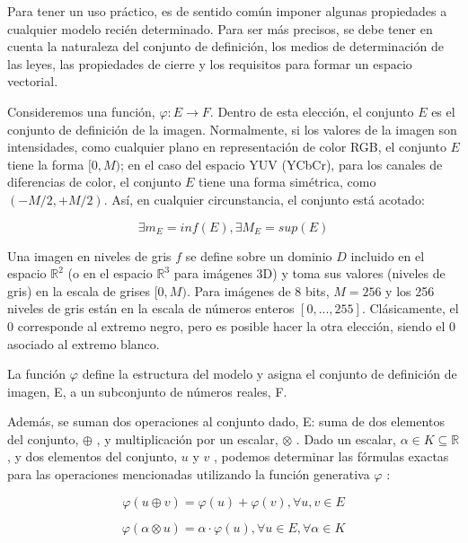 Para tener un uso práctico, es de sentido común imponer algunas propiedades a cualquier modelo recién determinado. Para ser más precisos, se debe tener en cuenta la naturaleza del conjunto de definición, los medios de determinación de las leyes, las propiedades de cierre y los requisitos para formar un espacio vectorial. 

Consideremos una función, $\varphi : E \rightarrow F$. Dentro de esta elección, el conjunto $E$ es el conjunto de definición de la imagen. Normalmente, si los valores de la imagen son intensidades, como cualquier plano en representación de color RGB, el conjunto $E$ tiene la forma $[0,M)$; en el caso del espacio YUV (YCbCr), para los canales de diferencias de color, el conjunto $E$ tiene una forma simétrica, como $( - M/2 , + M/2 )$. Así, en cualquier circunstancia, el conjunto está acotado:

\begin{equation}
	\exists m_E=inf(E),\exists M_E=sup(E)
\end{equation}

Una imagen en niveles de gris $f$ se define sobre un dominio $D$ incluido en el espacio $\mathbb{R}^2$ (o en el espacio $\mathbb{R}^3$  para imágenes 3D) y toma sus valores (niveles de gris) en la escala de grises $[0, M)$. Para imágenes de 8 bits, $ M = 256$ y los 256 niveles de gris están en la escala de números enteros $[0,..., 255]$. Clásicamente, el 0 corresponde al extremo negro, pero es posible hacer la otra elección, siendo el 0 asociado al extremo blanco.

La función $\varphi$ define la estructura del modelo y asigna el conjunto de definición de imagen, E, a un subconjunto de números reales, F.

Además, se suman dos operaciones al conjunto dado, E: suma de dos elementos del conjunto, $\oplus$ , y multiplicación por un escalar, $\otimes$ . Dado un escalar, $\alpha \in K \subseteq \mathbb{R}$ , y dos elementos del conjunto, $u$ y $v$ , podemos determinar las fórmulas exactas para las operaciones mencionadas utilizando la función generativa $\varphi$ :

\begin{equation}
	\varphi(u\oplus v) = \varphi(u)+\varphi(v), \forall u,v \in E
\end{equation}

\begin{equation}
	\varphi(\alpha \otimes u) = \alpha \cdot \varphi(u), \forall u \in E, \forall \alpha \in K
\end{equation}

